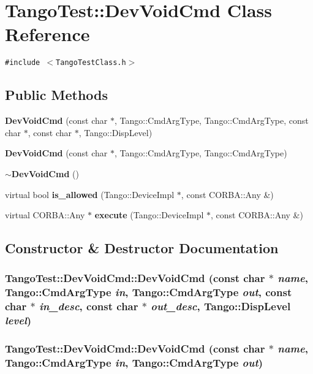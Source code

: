 \section{Tango\-Test::Dev\-Void\-Cmd  Class Reference}
\label{classTangoTest_1_1DevVoidCmd}
{\tt \#include $<$Tango\-Test\-Class.h$>$}

\subsection*{Public Methods}
\begin{CompactItemize}
\item 
{\bf Dev\-Void\-Cmd} (const char $\ast$, Tango::Cmd\-Arg\-Type, Tango::Cmd\-Arg\-Type, const char $\ast$, const char $\ast$, Tango::Disp\-Level)
\item 
{\bf Dev\-Void\-Cmd} (const char $\ast$, Tango::Cmd\-Arg\-Type, Tango::Cmd\-Arg\-Type)
\item 
{\bf $\sim$Dev\-Void\-Cmd} ()
\item 
virtual bool {\bf is\_\-allowed} (Tango::Device\-Impl $\ast$, const CORBA::Any \&)
\item 
virtual CORBA::Any $\ast$ {\bf execute} (Tango::Device\-Impl $\ast$, const CORBA::Any \&)
\end{CompactItemize}


\subsection{Constructor \& Destructor Documentation}
\subsubsection{\setlength{\rightskip}{0pt plus 5cm}Tango\-Test::Dev\-Void\-Cmd::Dev\-Void\-Cmd (const char $\ast$ {\em name}, Tango::Cmd\-Arg\-Type {\em in}, Tango::Cmd\-Arg\-Type {\em out}, const char $\ast$ {\em in\_\-desc}, const char $\ast$ {\em out\_\-desc}, Tango::Disp\-Level {\em level})}\label{classTangoTest_1_1DevVoidCmd_a0}


\subsubsection{\setlength{\rightskip}{0pt plus 5cm}Tango\-Test::Dev\-Void\-Cmd::Dev\-Void\-Cmd (const char $\ast$ {\em name}, Tango::Cmd\-Arg\-Type {\em in}, Tango::Cmd\-Arg\-Type {\em out})}\label{classTangoTest_1_1DevVoidCmd_a1}


